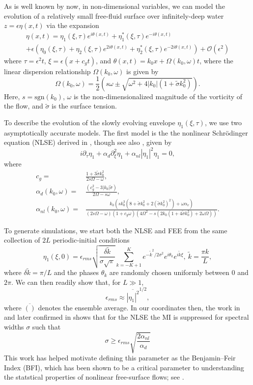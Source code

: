 \documentclass[a4paper,11pt]{article}
\newcommand{\pd}{\partial}
\begin{document}
As is well known by now, in non-dimensional variables, we can model the evolution of a relatively small free-fluid surface over infinitely-deep water $z=\epsilon \eta(x,t)$ via the expansion 
\begin{multline*}
\eta(x,t) = \eta_{1}(\xi,\tau)e^{i\theta(x,t)} + \eta^{\ast}_{1}(\xi,\tau)e^{-i\theta(x,t)}\\
+ \epsilon\left(\eta_{0}(\xi,\tau) + \eta_{2}(\xi,\tau)e^{2i\theta(x,t)} + \eta^{\ast}_{2}(\xi,\tau)e^{-2i\theta(x,t)}\right) + \mathcal{O}\left(\epsilon^{2} \right)
\end{multline*}
where $\tau = \epsilon^{2}t$, $\xi = \epsilon(x+c_{g}t)$, and $\theta(x,t) = k_{0}x + \Omega(k_{0},\omega)t$, where the linear dispersion relationship $\Omega(k_{0},\omega)$ is given by
\[
\Omega(k_{0},\omega) = \frac{1}{2}\left(s\omega \pm \sqrt{\omega^{2} + 4|k_{0}|\left(1+\tilde{\sigma}k_{0}^{2}\right)} \right).
\]
Here, $s = \mbox{sgn}(k_{0})$, $\omega$ is the non-dimensionalized magnitude of the vorticity of the flow, and $\tilde{\sigma}$ is the surface tension.  

To describe the evolution of the slowly evolving envelope $\eta_{1}(\xi,\tau)$, we use two asymptotically accurate models.  The first model is the the nonlinear Schr\"{o}dinger equation (NLSE) derived in \cite{curtis8}, though see also \cite{thomas2012nonlinear}, given by 
\[
i\pd_{\tau}\eta_{1} + \alpha_{d}\pd_{\xi}^{2}\eta_{1} + \alpha_{nl}\left|\eta_{1} \right|^{2}\eta_{1} = 0, 
\]
where 
\begin{align*}
c_{g} = & \frac{1+3\tilde{\sigma}k_{0}^{2}}{2s\Omega - \omega},\\
\alpha_{d}(k_{0},\omega) = & \frac{(c^2_{g} - 3|k_{0}|\tilde{\sigma})}{2\Omega-s\omega},\\
\alpha_{nl}(k_{0},\omega) = & \frac{k_{0}\left( sk_{0}^{3}\left(8 + \tilde{\sigma}k_{0}^{2} + 2(\tilde{\sigma}k_{0}^{2})^{2}\right) + \omega \alpha_{v}\right)}{\left(2s\Omega -\omega\right)(1+c_{g}\omega)\left(4\Omega^2-s(2k_{0}(1+4\tilde{\sigma}k_{0}^{2})+2\omega\Omega)\right)}.
\end{align*}

To generate simulations, we start both the NLSE and FEE from the same collection of $2L$ periodic-initial conditions
\[
\eta_{1}(\xi,0) = \epsilon_{rms}\sqrt{\frac{\delta \tilde{k}}{\sigma\sqrt{\pi}}} \sum_{k=-K+1}^{K}e^{-\tilde{k}^{2}/2\sigma^{2}}e^{i\theta_{k}}e^{i\tilde{k}\xi}, ~ \tilde{k} = \frac{\pi k}{L},
\]
where $\delta \tilde{k}=\pi/L$ and the phases $\theta_{k}$ are randomly chosen uniformly between $0$ and $2\pi$.  We can then readily show that, for $L\gg 1$, 
\[
\epsilon_{rms} \approx \overline{\left|\eta_{1}\right|^{2}}^{1/2},
\]
where $\overline{()}$ denotes the ensemble average.  In our coordinates then, the work in \cite{alber} and later confirmed in \cite{dysthe2} shows that for the NLSE the MI is suppressed for spectral widths $\sigma$ such that 
\[
\sigma \geq \epsilon_{rms}\sqrt{\frac{2\alpha_{nl}}{\alpha_{d}}}
\]
This work has helped motivate defining this parameter as the Benjamin--Feir Index (BFI), which has been shown to be a critical parameter to understanding the statstical properties of nonlinear free-surface flows; see \cite{onorato, thomas2012nonlinear}.
\end{document}

